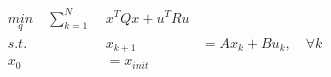 \documentclass[preview]{standalone}
\begin{document}
\begin{align*}
\underset{q}{min}  \quad \sum_{k=1}^N \; &x^TQx + u^T R u \\ s.t. \quad &x_{k+1} &= Ax_k + Bu_k, \quad \forall k \\ x_0 &= x_{init}
\end{align*}
\end{document}
